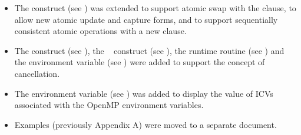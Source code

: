 \begin{itemize}
\item The  construct (see 
) was extended to support 
atomic swap with the  clause, to allow new atomic update and capture 
forms, and to support sequentially consistent atomic operations with a new  
clause. 

\item The  construct (see 
), the ~ construct (see 
), 
the  
runtime routine (see 
) 
and the  
environment variable (see 
) were added to support the 
concept of cancellation. 

\item The  environment variable (see 
) was 
added to display the value of ICVs associated with the OpenMP environment 
variables. 

\item Examples (previously Appendix A) were moved to a separate document. 
\end{itemize}







